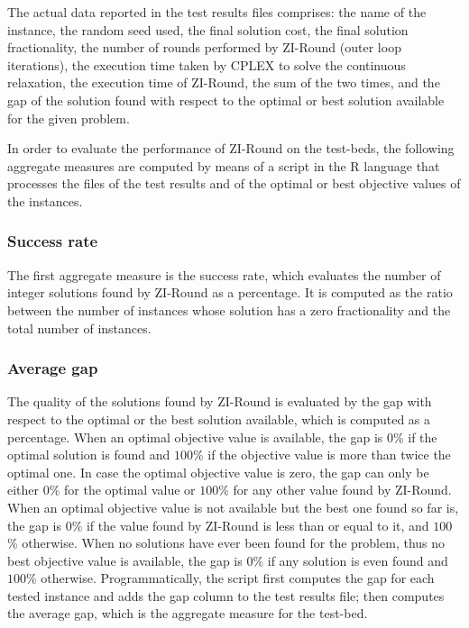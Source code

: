 \documentclass[a4paper,12pt,twoside]{scrbook}
\begin{document}
The actual data reported in the test results files comprises: the name of the instance, the random seed used, the final solution cost, the final solution fractionality, the number of rounds performed by ZI-Round (outer loop iterations), the execution time taken by CPLEX to solve the continuous relaxation, the execution time of ZI-Round, the sum of the two times, and the gap of the solution found with respect to the optimal or best solution available for the given problem. \par 

In order to evaluate the performance of ZI-Round on the test-beds, the following aggregate measures are computed by means of a script in the R language that processes the files of the test results and of the optimal or best objective values of the instances. \par
\subsubsection{Success rate}
The first aggregate measure is the success rate, which evaluates the number of integer solutions found by ZI-Round as a percentage. It is computed as the ratio between the number of instances whose solution has a zero fractionality and the total number of instances. \par
\subsubsection{Average gap}
The quality of the solutions found by ZI-Round is evaluated by the gap with respect to the optimal or the best solution available, which is computed as a percentage. When an optimal objective value is available, the gap is $0$\% if the optimal solution is found and $100$\% if the objective value is more than twice the optimal one. In case the optimal objective value is zero, the gap can only be either $0$\% for the optimal value or $100$\% for any other value found by ZI-Round. When an optimal objective value is not available but the best one found so far is, the gap is $0$\% if the value found by ZI-Round is less than or equal to it, and $100$\% otherwise. When no solutions have ever been found for the problem, thus no best objective value is available, the gap is $0$\% if any solution is even found and $100$\% otherwise. Programmatically, the script first computes the gap for each tested instance and adds the gap column to the test results file; then computes the average gap, which is the aggregate measure for the test-bed. \par
\end{document}

